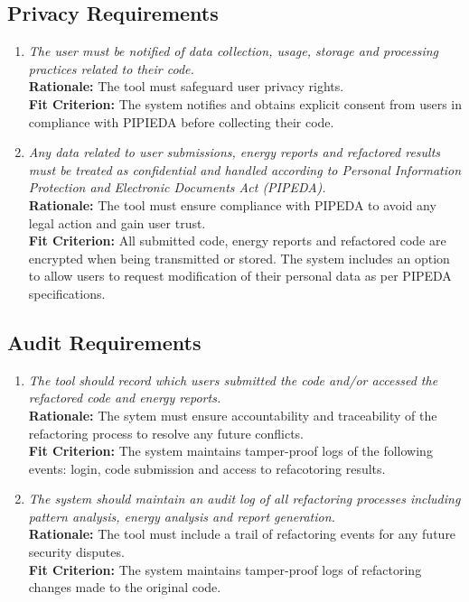 \documentclass[12pt]{article}
\begin{document}
\subsection{Privacy Requirements}
\begin{enumerate}[label=SR-PR \arabic*., wide=0pt, leftmargin=*]
	\item \emph{The user must be notified of data collection, usage, storage and processing practices related to their code. }\\
    {\bf Rationale:} The tool must safeguard user privacy rights.\\
    {\bf Fit Criterion:} The system notifies and obtains explicit consent from users in compliance with PIPIEDA before collecting their code.
  \item \emph{Any data related to user submissions, energy reports and refactored results must be treated as confidential and handled according to Personal Information Protection and Electronic Documents Act (PIPEDA).}\\
  {\bf Rationale:} The tool must ensure compliance with PIPEDA to avoid any legal action and gain user trust.\\
  {\bf Fit Criterion:} All submitted code, energy reports and refactored code are encrypted when being transmitted or stored. The system includes an option to allow users to request modification of their personal data as per PIPEDA specifications.
\end{enumerate}
\subsection{Audit Requirements}
\begin{enumerate}[label=SR-AUR \arabic*., wide=0pt, leftmargin=*]
	\item \emph{The tool should record which users submitted the code and/or accessed the refactored code and energy reports.}\\
    {\bf Rationale:} The sytem must ensure accountability and traceability of the refactoring process to resolve any future conflicts.\\
    {\bf Fit Criterion:} The system maintains tamper-proof logs of the following events: login, code submission and access to refacotoring results.
  \item \emph{The system should maintain an audit log of all refactoring processes including pattern analysis, energy analysis and report generation. }\\
  {\bf Rationale:} The tool must include a trail of refactoring events for any future security disputes.\\
  {\bf Fit Criterion:}  The system maintains tamper-proof logs of refactoring changes made to the original code.
\end{enumerate}
\end{document}

